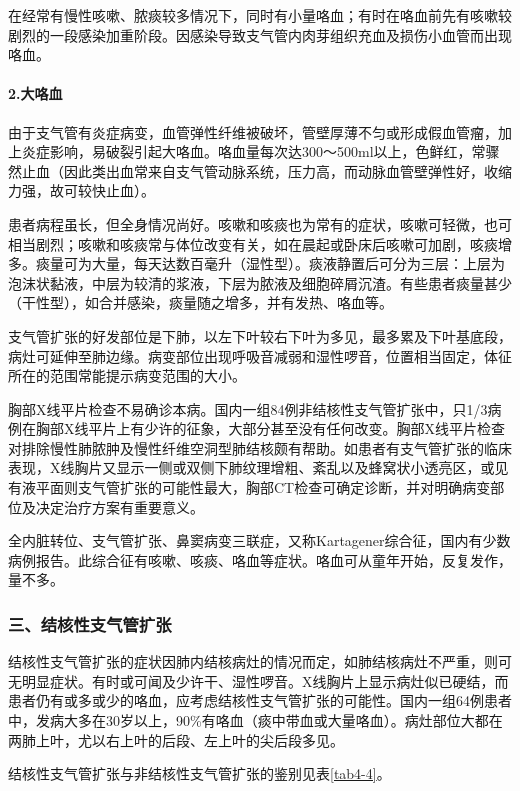 在经常有慢性咳嗽、脓痰较多情况下，同时有小量咯血；有时在咯血前先有咳嗽较剧烈的一段感染加重阶段。因感染导致支气管内肉芽组织充血及损伤小血管而出现咯血。

\paragraph{2.大咯血}

由于支气管有炎症病变，血管弹性纤维被破坏，管壁厚薄不匀或形成假血管瘤，加上炎症影响，易破裂引起大咯血。咯血量每次达300～500ml以上，色鲜红，常骤然止血（因此类出血常来自支气管动脉系统，压力高，而动脉血管壁弹性好，收缩力强，故可较快止血）。

患者病程虽长，但全身情况尚好。咳嗽和咳痰也为常有的症状，咳嗽可轻微，也可相当剧烈；咳嗽和咳痰常与体位改变有关，如在晨起或卧床后咳嗽可加剧，咳痰增多。痰量可为大量，每天达数百毫升（湿性型）。痰液静置后可分为三层：上层为泡沫状黏液，中层为较清的浆液，下层为脓液及细胞碎屑沉渣。有些患者痰量甚少（干性型），如合并感染，痰量随之增多，并有发热、咯血等。

支气管扩张的好发部位是下肺，以左下叶较右下叶为多见，最多累及下叶基底段，病灶可延伸至肺边缘。病变部位出现呼吸音减弱和湿性啰音，位置相当固定，体征所在的范围常能提示病变范围的大小。

胸部X线平片检查不易确诊本病。国内一组84例非结核性支气管扩张中，只1/3病例在胸部X线平片上有少许的征象，大部分甚至没有任何改变。胸部X线平片检查对排除慢性肺脓肿及慢性纤维空洞型肺结核颇有帮助。如患者有支气管扩张的临床表现，X线胸片又显示一侧或双侧下肺纹理增粗、紊乱以及蜂窝状小透亮区，或见有液平面则支气管扩张的可能性最大，胸部CT检查可确定诊断，并对明确病变部位及决定治疗方案有重要意义。

全内脏转位、支气管扩张、鼻窦病变三联症，又称Kartagener综合征，国内有少数病例报告。此综合征有咳嗽、咳痰、咯血等症状。咯血可从童年开始，反复发作，量不多。

\subsubsection{三、结核性支气管扩张}

结核性支气管扩张的症状因肺内结核病灶的情况而定，如肺结核病灶不严重，则可无明显症状。有时或可闻及少许干、湿性啰音。X线胸片上显示病灶似已硬结，而患者仍有或多或少的咯血，应考虑结核性支气管扩张的可能性。国内一组64例患者中，发病大多在30岁以上，90\%有咯血（痰中带血或大量咯血）。病灶部位大都在两肺上叶，尤以右上叶的后段、左上叶的尖后段多见。

结核性支气管扩张与非结核性支气管扩张的鉴别见表\ref{tab4-4}。

